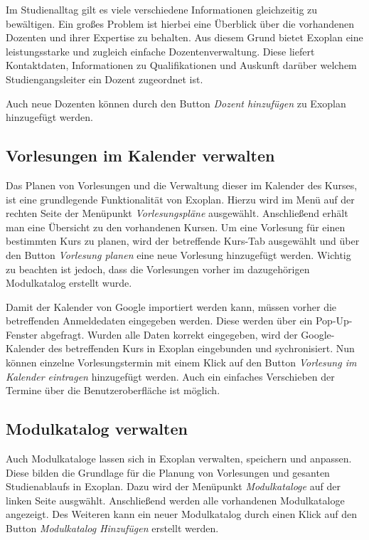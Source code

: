 Im Studienalltag gilt es viele verschiedene Informationen gleichzeitig zu bewältigen. Ein großes Problem ist hierbei eine Überblick über die vorhandenen Dozenten und ihrer Expertise zu behalten. Aus diesem Grund bietet Exoplan eine leistungsstarke und zugleich einfache Dozentenverwaltung. Diese liefert Kontaktdaten, Informationen zu Qualifikationen und Auskunft darüber welchem Studiengangsleiter ein Dozent zugeordnet ist.

Auch neue Dozenten können durch den Button \textit{Dozent hinzufügen} zu Exoplan hinzugefügt werden.
\subsection{Vorlesungen im Kalender verwalten}

Das Planen von Vorlesungen und die Verwaltung dieser im Kalender des Kurses, ist eine grundlegende Funktionalität von Exoplan. Hierzu wird im Menü auf der rechten Seite der Menüpunkt \textit{Vorlesungspläne} ausgewählt. Anschließend erhält man eine Übersicht zu den vorhandenen Kursen. Um eine Vorlesung für einen bestimmten Kurs zu planen, wird der betreffende Kurs-Tab ausgewählt und über den Button \textit{Vorlesung planen} eine neue Vorlesung hinzugefügt werden. Wichtig zu beachten ist jedoch, dass die Vorlesungen vorher im dazugehörigen Modulkatalog erstellt wurde.

Damit der Kalender von Google importiert werden kann, müssen vorher die betreffenden Anmeldedaten eingegeben werden. Diese werden über ein Pop-Up-Fenster abgefragt. Wurden alle Daten korrekt eingegeben, wird der Google-Kalender des betreffenden Kurs in Exoplan eingebunden und sychronisiert. Nun können einzelne Vorlesungstermin mit einem Klick auf den Button \textit{Vorlesung im Kalender eintragen} hinzugefügt werden. Auch ein einfaches Verschieben der Termine über die Benutzeroberfläche ist möglich.

\subsection{Modulkatalog verwalten}

Auch Modulkataloge lassen sich in Exoplan verwalten, speichern und anpassen. Diese bilden die Grundlage für die Planung von Vorlesungen und gesanten Studienablaufs in Exoplan. Dazu wird der Menüpunkt \textit{Modulkataloge} auf der linken Seite ausgwählt. Anschließend werden alle vorhandenen Modulkataloge angezeigt. Des Weiteren kann ein neuer Modulkatalog durch einen Klick auf den Button \textit{Modulkatalog Hinzufügen} erstellt werden. 

